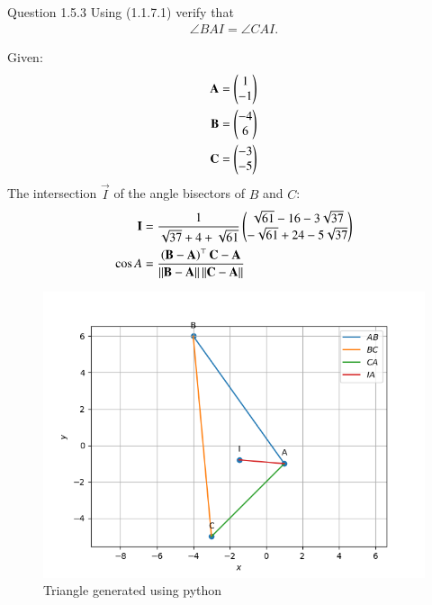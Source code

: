 \documentclass[journal,12pt,twocolumn]{IEEEtran}
\theoremstyle{remark}
\begin{document}
Question 1.5.3
Using (1.1.7.1) verify that 
\begin{align}\angle BAI = \angle CAI.\end{align}

Given:
\begin{align}
\mathbf{A} = \begin{pmatrix}1\\-1\end{pmatrix}\\
\mathbf{B} = \begin{pmatrix}-4\\6\end{pmatrix}\\
\mathbf{C} = \begin{pmatrix}-3\\-5\end{pmatrix}
\end{align}
The intersection $\vec{I}$ of the angle bisectors of $B$ and $C$:
\begin{align}
\mathbf{I} &= \frac{1}{\sqrt{37}+ 4 +\sqrt{61}}\begin{pmatrix}
{\sqrt{61}-16-3\sqrt{37}}\\
{-\sqrt{61}+24-5\sqrt{37}}
\end{pmatrix}\\
\cos{A} &= \frac{\left(\mathbf{B} - \mathbf{A}\right)^{\top}\mathbf{C} - \mathbf{A}}{\left\lVert\mathbf{B} - \mathbf{A}\right\rVert \left\lVert \mathbf{C} - \mathbf{A}\right\rVert}
\end{align}
\begin{figure}
\centering
\includegraphics[width=\columnwidth]{./fig/main.png}
\caption{Triangle generated using python}
\label{fig:tri_sss_py}
\end{figure}
\solution
\end{document}
